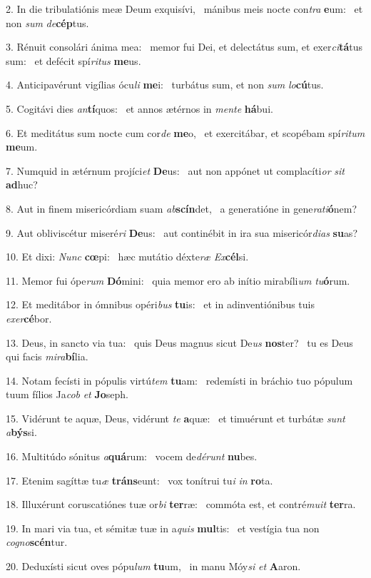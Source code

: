 2. In die tribulatiónis meæ Deum exquisívi, \dag\  mánibus meis nocte con\textit{tra} \textbf{e}um: \ast\  et non \textit{sum} \textit{de}\textbf{cép}tus.\

3. Rénuit consolári ánima mea: \dag\  memor fui Dei, et delectátus sum, et exer\textit{ci}\textbf{tá}tus sum: \ast\  et defécit spí\textit{ri}\textit{tus} \textbf{me}us.\

4. Anticipavérunt vigílias ócu\textit{li} \textbf{me}i: \ast\  turbátus sum, et non \textit{sum} \textit{lo}\textbf{cú}tus.\

5. Cogitávi dies \textit{an}\textbf{tí}quos: \ast\  et annos ætérnos in \textit{men}\textit{te} \textbf{há}bui.\

6. Et meditátus sum nocte cum cor\textit{de} \textbf{me}o, \ast\  et exercitábar, et scopébam spí\textit{ri}\textit{tum} \textbf{me}um.\

7. Numquid in ætérnum projíci\textit{et} \textbf{De}us: \ast\  aut non appónet ut complacíti\textit{or} \textit{sit} \textbf{ad}huc?\

8. Aut in finem misericórdiam suam \textit{ab}\textbf{scín}det, \ast\  a generatióne in gene\textit{ra}\textit{ti}\textbf{ó}nem?\

9. Aut obliviscétur miseré\textit{ri} \textbf{De}us: \ast\  aut continébit in ira sua misericór\textit{di}\textit{as} \textbf{su}as?\

10. Et dixi: \textit{Nunc} \textbf{cœ}pi: \ast\  hæc mutátio déxte\textit{ræ} \textit{Ex}\textbf{cél}si.\

11. Memor fui ópe\textit{rum} \textbf{Dó}mini: \ast\  quia memor ero ab inítio mirabíli\textit{um} \textit{tu}\textbf{ó}rum.\

12. Et meditábor in ómnibus opéri\textit{bus} \textbf{tu}is: \ast\  et in adinventiónibus tuis \textit{ex}\textit{er}\textbf{cé}bor.\

13. Deus, in sancto via tua: \dag\  quis Deus magnus sicut De\textit{us} \textbf{nos}ter? \ast\  tu es Deus qui facis \textit{mi}\textit{ra}\textbf{bí}lia.\

14. Notam fecísti in pópulis virtú\textit{tem} \textbf{tu}am: \ast\  redemísti in bráchio tuo pópulum tuum fílios Ja\textit{cob} \textit{et} \textbf{Jo}seph.\

15. Vidérunt te aquæ, Deus, vidérunt \textit{te} \textbf{a}quæ: \ast\  et timuérunt et turbátæ \textit{sunt} \textit{a}\textbf{býs}si.\

16. Multitúdo sónitus \textit{a}\textbf{quá}rum: \ast\  vocem de\textit{dé}\textit{runt} \textbf{nu}bes.\

17. Etenim sagíttæ tu\textit{æ} \textbf{tráns}eunt: \ast\  vox tonítrui tu\textit{i} \textit{in} \textbf{ro}ta.\

18. Illuxérunt coruscatiónes tuæ or\textit{bi} \textbf{ter}ræ: \ast\  commóta est, et contré\textit{mu}\textit{it} \textbf{ter}ra.\

19. In mari via tua, et sémitæ tuæ in a\textit{quis} \textbf{mul}tis: \ast\  et vestígia tua non \textit{co}\textit{gno}\textbf{scén}tur.\

20. Deduxísti sicut oves pópu\textit{lum} \textbf{tu}um, \ast\  in manu Móy\textit{si} \textit{et} \textbf{A}aron.\

